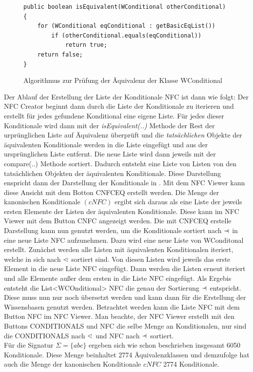 \documentclass[12pt,a4paper]{article}
\newcommand\dotl{\mathrel{%
    \mathchoice{\QEQ}{\QEQ}{\QEQ}{\QEQ}%
}}
\def\QEQ{{%
    \setbox0\hbox{<}%
    \rlap{\hbox to \wd0{\hss \raisebox {0.1pt}{$\ \cdot$\hss}}}\box0
}}
\newcommand\rdotl{\mathrel{%
    \mathchoice{\RQEQ}{\RQEQ}{\RQEQ}{\RQEQ}%
}}
\def\RQEQ{{%
    \setbox0\hbox{$\prec$}%
    \rlap{\hbox to \wd0{\hss \raisebox {0.01pt}{$\ \cdot$\hss}}}\box0
}}
\begin{document}
\begin{figure}
\begin{lstlisting}
public boolean isEquivalent(WConditional otherConditional) {
    for (WConditional eqConditional : getBasicEqList())
        if (otherConditional.equals(eqConditional))
            return true;
    return false;
}
\end{lstlisting}
\caption{Algorithmus zur Prüfung der Äquivalenz der Klasse WConditional}
\label{code:test-equivalence}
\end{figure} 


Der Ablauf der Erstellung der Liste der Konditionale NFC ist dann wie folgt: Der NFC Creator beginnt dann durch die Liste der Konditionale zu iterieren und erstellt für jedes gefundene Konditional eine eigene Liste. Für jedes dieser Konditionale wird dann mit der \textit{isEquivalent(..)} Methode der Rest der urprünglichen Liste auf Äquivalenz überprüft und die \textit{tatsächlichen} Objekte der äquivalenten Konditionale werden in die Liste eingefügt und aus der ursprünglichen Liste entfernt. Die neue Liste wird dann jeweils mit der compare(..) Methode sortiert. Dadurch entsteht eine Liste von Listen von den tatsächlichen Objekten der äquivalenten Konditionale. Diese Darstellung enspricht dann der Darstellung der Konditionale in \cite{beierle19}. Mit dem NFC Viewer kann diese Ansicht mit dem Botton CNFCEQ erstellt werden. Die Menge der kanonischen Konditionale $(cNFC)$ ergibt sich daraus als eine Liste der jeweils ersten Elemente der Listen der äquivalenten Konditionale. Diese kann im NFC Viewer mit dem Button CNFC angezeigt werden.
Die mit CNFCEQ erstelle Darstellung kann nun genutzt werden, um die Konditionale sortiert nach $\rdotl$ in eine neue Liste NFC aufzunehmen. Dazu wird eine neue Liste von WConditonal erstellt. Zunächst werden alle Listen mit äquivalenten Konditionalen iteriert, welche in sich nach $\dotl$ sortiert sind. Von diesen Listen wird jeweils das erste Element in die neue Liste NFC eingefügt. Dann werden die Listen erneut iteriert und alle Elemente außer dem ersten in die Liste NFC eingefügt. Als Ergebis entsteht die List<WCOnditional> NFC die genau der Sortierung $\rdotl$ entspricht. Diese muss nun nur noch übersetzt werden und kann dann für die Erstellung der Wissensbasen genutzt werden. Betrachtet werden kann die Liste NFC mit dem Button NFC im NFC Viewer. Man beachte, der NFC Viewer erstellt mit den Buttons CONDITIONALS und NFC die selbe Menge an Konditionalen, nur sind die CONDITIONALS nach $\dotl$ und NFC nach $\rdotl$ sortiert. \\
Für die Signatur $\Sigma=\{abc\}$ ergeben sich wie schon beschrieben insgesamt 6050 Konditionale. Diese Menge beinhaltet 2774 Äquivalenzklassen und demzufolge hat auch die Menge der kanonischen Konditionale $cNFC$ 2774 Konditionale.
\end{document}
